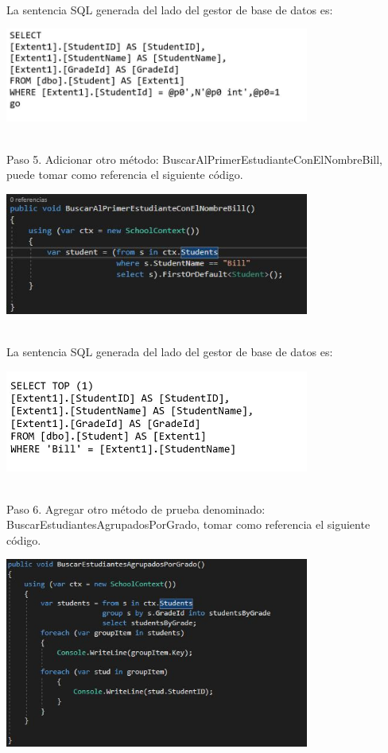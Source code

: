 \textbf{}\\
La sentencia SQL generada del lado del gestor de base de datos es: 

\begin{center}
	\includegraphics[width=10cm]{./Imagenes/U1-1} 
	\end{center}
\textbf{}\\

Paso 5. Adicionar otro método: BuscarAlPrimerEstudianteConElNombreBill, puede tomar como referencia el
siguiente código.

\begin{center}
	\includegraphics[width=10cm]{./Imagenes/Captura4} 
	\end{center}
\textbf{}\\

La sentencia SQL generada del lado del gestor de base de datos es: 

\begin{center}
	\includegraphics[width=10cm]{./Imagenes/U1-2} 
	\end{center}
\textbf{}\\
Paso 6. Agregar otro método de prueba denominado: BuscarEstudiantesAgrupadosPorGrado, tomar como
referencia el siguiente código.

\begin{center}
	\includegraphics[width=10cm]{./Imagenes/Captura5} 
	\end{center}
\textbf{}\\

